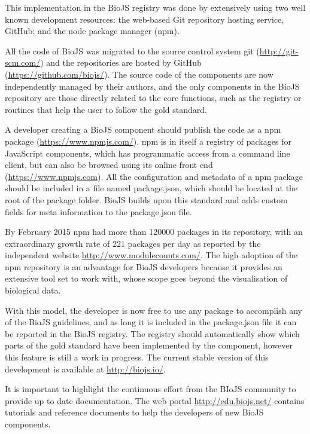 This implementation in the BioJS registry was done by extensively using two well known development resources: the web-based Git repository hosting service, GitHub; and the node package manager (npm). 

All the code of BioJS was migrated to the source control system git (\url{http://git-scm.com/}) and the repositories are hosted by GitHub (\url{https://github.com/biojs/}). The source code of the components are now independently managed by their authors, and the only components in the BioJS repository are those directly related to the core functions, such as the registry or routines that help the user to follow the gold standard.

A developer creating a BioJS component should publish the code as a npm package (\url{https://www.npmjs.com/}). npm is in itself a registry of packages for JavaScript components, which has programmatic access from a command line client, but can also be browsed using its online front end (\url{https://www.npmjs.com}). All the configuration and metadata of a npm package should be included in a file named package.json, which should be located at the root of the package folder. BioJS builds upon this standard and adds custom fields for meta information to the package.json file.

By February 2015 npm had more than 120000 packages in its repository, with an extraordinary growth rate of 221 packages per day as reported by the independent website \url{http://www.modulecounts.com/}. The high adoption of the npm repository is an advantage for BioJS developers because it provides an extensive tool set to work with, whose scope goes beyond the visualisation of biological data.

With this model, the developer is now free to use any package to accomplish any of the BioJS guidelines, and as long it is included in the package.json file it can be reported in the BioJS registry. The registry should automatically show which parts of the gold standard have been implemented by the component, however this feature is still a work in progress. The current stable version of this development is available at \url{http://biojs.io/}.

It is important to highlight the continuous effort from the BIoJS community to provide up to date documentation. The web portal \url{http://edu.biojs.net/} contains tutorials and reference documents to help the developers of new BioJS components.

